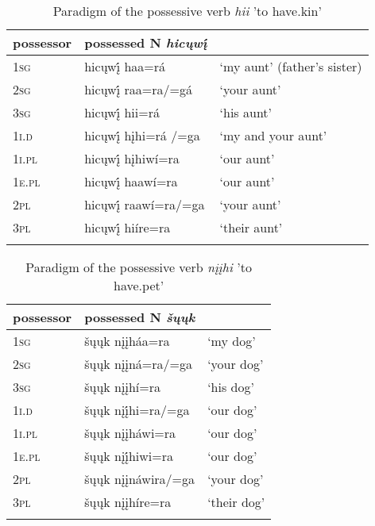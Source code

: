 \documentclass[output=paper]{LSP/langsci}
\begin{document}
\begin{table}
\caption{Paradigm of the possessive verb \textit{hii} 'to have.kin'} \label{havekin}
\begin{tabular}[h!]{ l l l }
\lsptoprule
possessor	& possessed N \textit{hicųwį́} &  \\
\midrule
\textsc{1sg}	& hicųwį́ haa=rá	 & `my aunt' (father's sister) \\
 
\textsc{2sg} & hicųwį́ raa=ra/=gá	& `your aunt' \\
 
\textsc{3sg} & hicųwį́ hii=rá	 & `his aunt' \\
 
\textsc{1i.d} & hicųwį́ hįhi=rá /=ga & `my and your aunt' \\
 
\textsc{1i.pl} & hicųwį́ hįhiwí=ra & `our  aunt' \\ 
 
\textsc{1e.pl} & hicųwį́ haawí=ra & `our aunt' \\
 
\textsc{2pl} & hicųwį́ raawí=ra/=ga & `your aunt'\\
 
\textsc{3pl} & hicųwį́ hiíre=ra & `their aunt' \\
\lspbottomrule 
\end{tabular}
\end{table}

\begin{table}
\caption{Paradigm of the possessive verb \textit{nįįhi} 'to have.pet'} \label{havepet}
\begin{tabular}[h!]{ l l l }
\lsptoprule
possessor	& possessed N \textit{šųųk} &  \\
\midrule	
\textsc{1sg} & šųųk nįįháa=ra & `my dog' \\
 
\textsc{2sg} & šųųk nįįná=ra/=ga & `your dog' \\
 
\textsc{3sg} & šųųk nįįhí=ra	& `his dog' \\
 
\textsc{1i.d} & šųųk nįį́hi=ra/=ga & `our dog' \\
 
\textsc{1i.pl} & šųųk nįįháwi=ra & `our  dog' \\
 
\textsc{1e.pl} & šųųk nįį́hiwi=ra & `our dog' \\
 
\textsc{2pl} & šųųk nįįnáwira/=ga & `your dog' \\
 
\textsc{3pl} & šųųk nįįhíre=ra & `their dog' \\
\lspbottomrule
\end{tabular}
\end{table}
\end{document}
